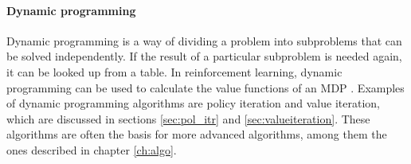 \paragraph{Dynamic programming}

Dynamic programming is a way of dividing a problem into subproblems that can be
solved independently. If the result of a particular subproblem is needed again,
it can be looked up from a table. In reinforcement learning, dynamic
programming can be used to calculate the value functions of an MDP
\parencite{bellman1957mdp}. Examples of dynamic programming algorithms are
policy iteration and value iteration, which are discussed in sections
\ref{sec:pol_itr} and \ref{sec:valueiteration}. These algorithms are often the
basis for more advanced algorithms, among them the ones described in chapter
\ref{ch:algo}. 
